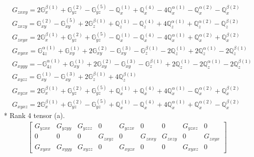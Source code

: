 \documentclass[fleqn,8pt,landscape]{jsarticle}
\begin{document}
\begin{align*}
& G_{zxxy} = 2 \mathbb{G}_{x}^{\beta(1)} + \mathbb{G}_{yz}^{(2)} - \mathbb{G}_{yz}^{(5)} - \mathbb{Q}_{x}^{(1)} + \mathbb{Q}_{x}^{(4)} - 4 \mathbb{Q}_{x}^{\alpha(1)} - \mathbb{Q}_{x}^{\alpha(2)} - \mathbb{Q}_{x}^{\beta(2)} \\
& G_{zxzy} = \mathbb{G}_{xy}^{(2)} - \mathbb{G}_{xy}^{(5)} + 2 \mathbb{G}_{z}^{\beta(1)} + \mathbb{Q}_{z}^{(1)} - \mathbb{Q}_{z}^{(4)} + 4 \mathbb{Q}_{z}^{\alpha(1)} + \mathbb{Q}_{z}^{\alpha(2)} - \mathbb{Q}_{z}^{\beta(2)} \\
& G_{zxyx} = 2 \mathbb{G}_{x}^{\beta(1)} + \mathbb{G}_{yz}^{(2)} + \mathbb{G}_{yz}^{(5)} - \mathbb{Q}_{x}^{(1)} - \mathbb{Q}_{x}^{(4)} - 4 \mathbb{Q}_{x}^{\alpha(1)} + \mathbb{Q}_{x}^{\alpha(2)} + \mathbb{Q}_{x}^{\beta(2)} \\
& G_{xyxx} = \mathbb{G}_{4z}^{\alpha(1)} + \mathbb{G}_{xy}^{(1)} + 2 \mathbb{G}_{xy}^{(2)} - \mathbb{G}_{xy}^{(3)} - \mathbb{G}_{z}^{\beta(1)} - 2 \mathbb{Q}_{z}^{(1)} + 2 \mathbb{Q}_{z}^{\alpha(1)} - 2 \mathbb{Q}_{z}^{\beta(1)} \\
& G_{xyyy} = - \mathbb{G}_{4z}^{\alpha(1)} + \mathbb{G}_{xy}^{(1)} + 2 \mathbb{G}_{xy}^{(2)} - \mathbb{G}_{xy}^{(3)} - \mathbb{G}_{z}^{\beta(1)} + 2 \mathbb{Q}_{z}^{(1)} - 2 \mathbb{Q}_{z}^{\alpha(1)} - 2 \mathbb{Q}_{z}^{\beta(1)} \\
& G_{xyzz} = \mathbb{G}_{xy}^{(1)} - \mathbb{G}_{xy}^{(3)} + 2 \mathbb{G}_{z}^{\beta(1)} + 4 \mathbb{Q}_{z}^{\beta(1)} \\
& G_{xyzx} = 2 \mathbb{G}_{x}^{\beta(1)} + \mathbb{G}_{yz}^{(2)} + \mathbb{G}_{yz}^{(5)} + \mathbb{Q}_{x}^{(1)} + \mathbb{Q}_{x}^{(4)} + 4 \mathbb{Q}_{x}^{\alpha(1)} - \mathbb{Q}_{x}^{\alpha(2)} + \mathbb{Q}_{x}^{\beta(2)} \\
& G_{xyxz} = 2 \mathbb{G}_{x}^{\beta(1)} + \mathbb{G}_{yz}^{(2)} - \mathbb{G}_{yz}^{(5)} + \mathbb{Q}_{x}^{(1)} - \mathbb{Q}_{x}^{(4)} + 4 \mathbb{Q}_{x}^{\alpha(1)} + \mathbb{Q}_{x}^{\alpha(2)} - \mathbb{Q}_{x}^{\beta(2)}
\end{align*}
* Rank 4 tensor (a).
\begin{align*}
\begin{bmatrix} G_{yzxx} & G_{yzyy} & G_{yzzz} & 0 & G_{yzzx} & 0 & 0 & G_{yzxz} & 0 \\ 0 & 0 & 0 & G_{zxyz} & 0 & G_{zxxy} & G_{zxzy} & 0 & G_{zxyx} \\ G_{xyxx} & G_{xyyy} & G_{xyzz} & 0 & G_{xyzx} & 0 & 0 & G_{xyxz} & 0 \end{bmatrix}
\end{align*}
\end{document}
